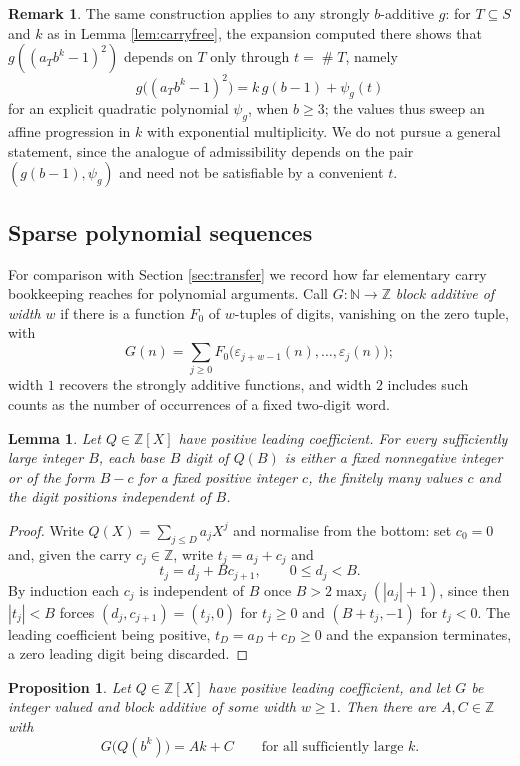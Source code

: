 \documentclass[11pt,reqno]{amsart}
\theoremstyle{plain}
\newtheorem{lemma}[theorem]{Lemma}
\newtheorem{proposition}[theorem]{Proposition}
\theoremstyle{definition}
\newtheorem{remark}[theorem]{Remark}
\newcommand{\N}{\mathbb{N}}
\newcommand{\Z}{\mathbb{Z}}
\DeclareMathOperator{\Card}{\#}
\begin{document}
\begin{remark}\label{rem:generalg}
The same construction applies to any strongly $b$-additive $g$: for $T\subseteq S$ and $k$ as in Lemma \ref{lem:carryfree}, the expansion computed there shows that $g((a_Tb^{k}-1)^{2})$ depends on $T$ only through $t=\Card T$, namely
\[
g\big((a_Tb^{k}-1)^{2}\big)=k\,g(b-1)+\psi_g(t)
\]
for an explicit quadratic polynomial $\psi_g$, when $b\ge3$; the values thus sweep an affine progression in $k$ with exponential multiplicity. We do not pursue a general statement, since the analogue of admissibility depends on the pair $(g(b-1),\psi_g)$ and need not be satisfiable by a convenient $t$.
\end{remark}

\subsection{Sparse polynomial sequences}\label{sec:blocking}
For comparison with Section \ref{sec:transfer} we record how far elementary carry bookkeeping reaches for polynomial arguments. Call $G\colon\N\to\Z$ \emph{block additive of width $w$} if there is a function $F_0$ of $w$-tuples of digits, vanishing on the zero tuple, with
\[
G(n)=\sum_{j\ge0}F_0\big(\varepsilon_{j+w-1}(n),\dots,\varepsilon_j(n)\big);
\]
width $1$ recovers the strongly additive functions, and width $2$ includes such counts as the number of occurrences of a fixed two-digit word.

\begin{lemma}\label{lem:carry}
Let $Q\in\Z[X]$ have positive leading coefficient. For every sufficiently large integer $B$, each base $B$ digit of $Q(B)$ is either a fixed nonnegative integer or of the form $B-c$ for a fixed positive integer $c$, the finitely many values $c$ and the digit positions independent of $B$.
\end{lemma}

\begin{proof}
Write $Q(X)=\sum_{j\le D}a_jX^{j}$ and normalise from the bottom: set $c_0=0$ and, given the carry $c_j\in\Z$, write $t_j=a_j+c_j$ and
\[
t_j=d_j+Bc_{j+1},\qquad 0\le d_j<B .
\]
By induction each $c_j$ is independent of $B$ once $B>2\max_j(|a_j|+1)$, since then $|t_j|<B$ forces $(d_j,c_{j+1})=(t_j,0)$ for $t_j\ge0$ and $(B+t_j,-1)$ for $t_j<0$. The leading coefficient being positive, $t_D=a_D+c_D\ge0$ and the expansion terminates, a zero leading digit being discarded.
\end{proof}

\begin{proposition}\label{prop:affine}
Let $Q\in\Z[X]$ have positive leading coefficient, and let $G$ be integer valued and block additive of some width $w\ge1$. Then there are $A,C\in\Z$ with
\[
G\big(Q(b^{k})\big)=Ak+C\qquad\text{for all sufficiently large }k .
\]
\end{proposition}
\end{document}
